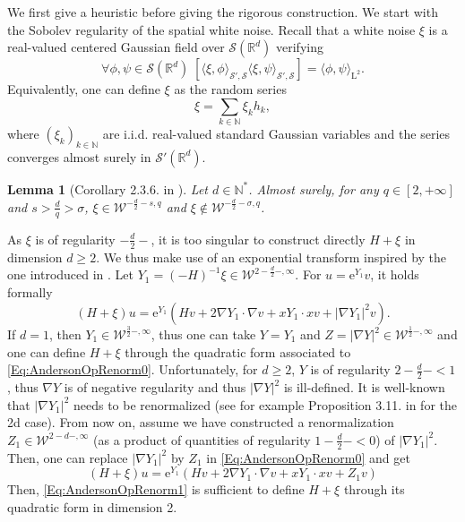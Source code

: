 \documentclass{article}
\def\W{\mathcal W}
\def\R{\mathbb R}
\def\N{\mathbb N}
\def\L{\mathrm L}
\newtheorem{lemme}[theo]{Lemma}
\theoremstyle{definition}
\numberwithin{equation}{section}
\newcommand{\e}{\mathrm{e}} %
\begin{document}
We first give a heuristic before giving the rigorous construction. We start with the Sobolev regularity of the spatial white noise. Recall that a white noise $\xi$ is a real-valued centered Gaussian field over $\mathcal{S}(\R^d)$ verifying
$$\forall \phi,\psi\in\mathcal{S}(\R^d)\; \left[\langle \xi,\phi\rangle_{\mathcal{S}',\mathcal{S}}\langle \xi,\psi\rangle_{\mathcal{S}',\mathcal{S}}\right]=\langle\phi,\psi\rangle_{\L^2}.$$
Equivalently, one can define $\xi$ as the random series 
$$\xi=\sum_{k\in\N}\xi_k h_k,$$
where $(\xi_k)_{k\in\N}$ are i.i.d. real-valued standard Gaussian variables and the series converges almost surely in $\mathcal{S}'(\R^d)$.

\begin{lemme}[Corollary 2.3.6. in \cite{PhDMackowiak}]
    Let $d\in\N^*$. Almost surely, for any $q\in[2,+\infty]$ and $s>\frac{d}{q}>\sigma$, $\xi\in\W^{-\frac{d}{2}-s,q}$ and $\xi\notin\W^{-\frac{d}{2}-\sigma,q}$.
\end{lemme}

As $\xi$ is of regularity $-\frac{d}{2}-$, it is too singular to construct directly $H+\xi$ in dimension $d\geqslant 2$. We thus make use of an exponential transform inspired by the one introduced in \cite{Haire_Labbe}. Let $ Y_1=(-H)^{-1}\xi\in\W^{2-\frac{d}{2}-,\infty}$. For $u=\e^{Y_1}v$, it holds formally
\begin{equation}\label{Eq:AndersonOpRenorm0}
    (H+\xi)u=\e^{Y_1}\left(H v + 2\nabla Y_1\cdot\nabla{v}+xY_1\cdot xv+|\nabla Y_1|^2v\right).
\end{equation}
If $d=1$, then $Y_1\in\W^{\frac{3}{2}-,\infty}$, thus one can take $Y=Y_1$ and $Z = |\nabla Y|^2\in\W^{\frac{1}{2}-,\infty}$ and one can define $H+\xi$ through the quadratic form associated to \cref{Eq:AndersonOpRenorm0}. Unfortunately, for $d\geqslant 2$, $Y$ is of regularity $2-\frac{d}{2}-<1$, thus $\nabla Y$ is of negative regularity and thus $|\nabla Y|^2$ is ill-defined. It is well-known that $|\nabla Y_1|^2$ needs to be renormalized (see for example Proposition 3.11. in \cite{Mackowiak_2025} for the 2d case). From now on, assume we have constructed a renormalization $ Z_1\in\W^{2-d-,\infty}$ (as a product of quantities of regularity $1-\frac{d}{2}-<0$) of $|\nabla Y_1|^2$. Then, one can replace $|\nabla Y_1|^2$ by $Z_1$ in \cref{Eq:AndersonOpRenorm0} and get
\begin{equation}\label{Eq:AndersonOpRenorm1}
    (H+\xi)u=\e^{ Y_1}\left(H v + 2\nabla Y_1\cdot\nabla{v} +xY_1\cdot xv+ Z_1v\right)
\end{equation}
Then, \cref{Eq:AndersonOpRenorm1} is sufficient to define $H+\xi$ through its quadratic form in dimension 2.\\
\end{document}
